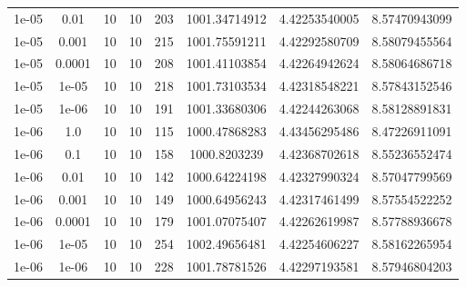 \documentclass[11pt,a4paper]{article}
\begin{document}
\begin{table}
{\begin{tabular}{*{8}c}
 1e-05 & 0.01 &10 &10 & 203& 1001.34714912 & 4.42253540005 & 8.57470943099 \\
 1e-05 & 0.001 &10 &10 & 215& 1001.75591211 & 4.42292580709 & 8.58079455564 \\
 1e-05 & 0.0001 &10 &10 & 208& 1001.41103854 & 4.42264942624 & 8.58064686718 \\
 1e-05 & 1e-05 &10 &10 & 218& 1001.73103534 & 4.42318548221 & 8.57843152546 \\
 1e-05 & 1e-06 &10 &10 & 191& 1001.33680306 & 4.42244263068 & 8.58128891831 \\
 1e-06 & 1.0 &10 &10 & 115& 1000.47868283 & 4.43456295486 & 8.47226911091 \\
 1e-06 & 0.1 &10 &10 & 158& 1000.8203239 & 4.42368702618 & 8.55236552474 \\
 1e-06 & 0.01 &10 &10 & 142& 1000.64224198 & 4.42327990324 & 8.57047799569 \\
 1e-06 & 0.001 &10 &10 & 149& 1000.64956243 & 4.42317461499 & 8.57554522252 \\
 1e-06 & 0.0001 &10 &10 & 179& 1001.07075407 & 4.42262619987 & 8.57788936678 \\
 1e-06 & 1e-05 &10 &10 & 254& 1002.49656481 & 4.42254606227 & 8.58162265954 \\
 1e-06 & 1e-06 &10 &10 & 228& 1001.78781526 & 4.42297193581 & 8.57946804203 \\
\end{tabular}}
\label{Tab::1}
\end{table} 
\end{document}
